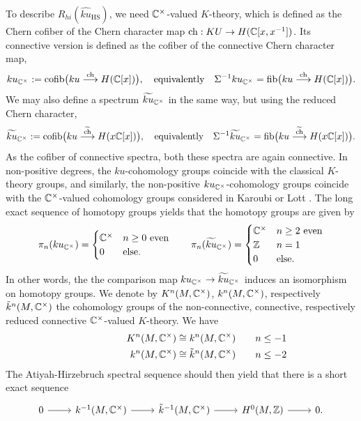 \documentclass[10pt]{amsart}
\begin{document}
To describe $R_{hi}(\widehat{ku}_{\mathrm{HS}})$, we need $\mathbb{C}^\times$-valued $K$-theory, which is defined as the Chern cofiber of the Chern character map $\mathrm{ch} : KU \to H(\mathbb{C}[x, x^{-1}])$. Its connective version is defined as the cofiber of the connective Chern character map,
\[
ku_{\mathbb{C}^\times} := \mathrm{cofib}\bigl(ku \stackrel{\mathrm{ch}}{\longrightarrow} H(\mathbb{C}[x])\bigr), \quad \text{equivalently}
\quad
\Sigma^{-1} ku_{\mathbb{C}^\times} = \mathrm{fib}\bigl(ku \stackrel{\mathrm{ch}}{\longrightarrow} H(\mathbb{C}[x])\bigr).
\]
We may also define a spectrum $\widetilde{ku}_{\mathbb{C}^\times}$ in the same way, but using the reduced Chern character, 
\[
\widetilde{ku}_{\mathbb{C}^\times} := \mathrm{cofib}\bigl(ku \stackrel{\widetilde{\mathrm{ch}}}{\longrightarrow} H(x\mathbb{C}[x])\bigr), \quad \text{equivalently}
\quad
\Sigma^{-1} \widetilde{ku}_{\mathbb{C}^\times} = \mathrm{fib}\bigl(ku \stackrel{\widetilde{\mathrm{ch}}}{\longrightarrow} H(x\mathbb{C}[x])\bigr).
\]
As the cofiber of connective spectra, both these spectra are again connective. In non-positive degrees, the $ku$-cohomology groups coincide with the classical $K$-theory groups, and similarly, the non-positive $ku_{\mathbb{C}^\times}$-cohomology groups coincide with the $\mathbb{C}^\times$-valued cohomology groups considered in Karoubi \cite{karoubi1987cyclichomology} or Lott \cite{lott1994rzindextheory}. The long exact sequence of homotopy groups yields that the homotopy groups are given by
\[
\pi_n(ku_{\mathbb{C}^\times}) = \begin{cases}
 \mathbb{C}^\times	& n \geq 0 ~\text{even}
 \\
 0 & \text{else}.
 \end{cases}
 \qquad
 \pi_n(\widetilde{ku}_{\mathbb{C}^\times}) = \begin{cases}
 \mathbb{C}^\times	& n \geq 2 ~\text{even}
 \\
 \mathbb{Z} & n=1
 \\
 0 & \text{else}.
 \end{cases}
\]
In other words, the the comparison map $ku_{\mathbb{C}^\times} \to \widetilde{ku}_{\mathbb{C}^\times}$ induces an isomorphism on homotopy groups. We denote by $K^n(M, \mathbb{C}^\times)$, $k^n(M, \mathbb{C}^\times)$, respectively $\tilde{k}^n(M, \mathbb{C}^\times)$ the cohomology groups of the non-connective, connective, respectively reduced connective $\mathbb{C}^\times$-valued $K$-theory. We have
\begin{align*}
K^n(M, \bC^\times) \cong k^n(M, \bC^\times)\rlap{\qquad$n\leq -1$}
\\ k^n(M, \bC^\times) \cong \tilde{k}^n(M, \bC^\times) \rlap{\qquad$n\leq -2$}
\end{align*}
The Atiyah-Hirzebruch spectral sequence should then yield that there is a short exact sequence
\[
\begin{tikzcd}
0
\ar[r]
&
k^{-1}(M, \bC^\times)	
\ar[r]
&
\tilde{k}^{-1}(M, \bC^\times) \ar[r] 
& 
H^0(M, \bZ)
\ar[r]
&
0.
\end{tikzcd}
\]
\end{document}
